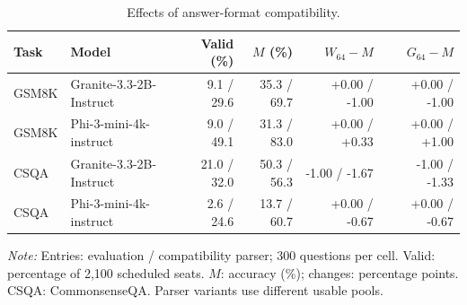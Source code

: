 \begin{table}[!htbp]\centering\small
\caption{Effects of answer-format compatibility.}\label{tab:followup-replication}
\begin{tabular*}{\textwidth}{@{\extracolsep{\fill}}llrrrr@{}}\toprule
Task & Model & Valid (\%) & $M$ (\%) & $W_{64}-M$ & $G_{64}-M$\\\midrule
GSM8K & Granite-3.3-2B-Instruct & 9.1 / 29.6 & 35.3 / 69.7 & +0.00 / -1.00 & +0.00 / -1.00\\
GSM8K & Phi-3-mini-4k-instruct & 9.0 / 49.1 & 31.3 / 83.0 & +0.00 / +0.33 & +0.00 / +1.00\\
CSQA & Granite-3.3-2B-Instruct & 21.0 / 32.0 & 50.3 / 56.3 & -1.00 / -1.67 & -1.00 / -1.33\\
CSQA & Phi-3-mini-4k-instruct & 2.6 / 24.6 & 13.7 / 60.7 & +0.00 / -0.67 & +0.00 / -0.67\\
\bottomrule\end{tabular*}
\par\smallskip\parbox{\textwidth}{\footnotesize \textit{Note:} Entries: evaluation / compatibility parser; 300 questions per cell. Valid: percentage of 2,100 scheduled seats. $M$: accuracy (\%); changes: percentage points. CSQA: CommonsenseQA. Parser variants use different usable pools.}
\end{table}
